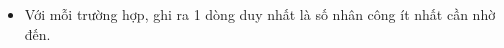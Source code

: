 \begin{itemize}
	\item Với mỗi trường hợp, ghi ra 1 dòng duy nhất là số nhân công ít nhất cần nhờ đến.
\end{itemize}